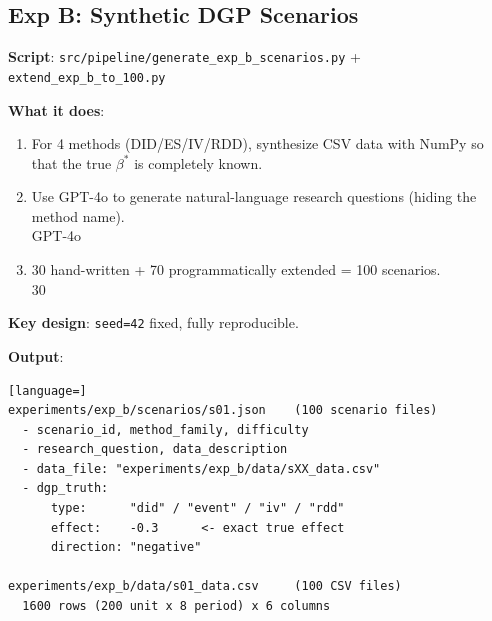 \documentclass[11pt,a4paper]{article}
\begin{document}
\subsection{Exp B: Synthetic DGP Scenarios}

\textbf{Script}: \texttt{src/pipeline/generate\_exp\_b\_scenarios.py} + \texttt{extend\_exp\_b\_to\_100.py}

\textbf{What it does}:
\begin{enumerate}[leftmargin=1.5em]
\item For 4 methods (DID/ES/IV/RDD), synthesize CSV data with NumPy so that the true $\beta^*$ is completely known. \\
      
\item Use GPT-4o to generate natural-language research questions (hiding the method name). \\
      GPT-4o 
\item 30 hand-written + 70 programmatically extended = 100 scenarios. \\
      30 
\end{enumerate}

\textbf{Key design}: \texttt{seed=42} fixed, fully reproducible.

\textbf{Output}:

\begin{lstlisting}[language=]
experiments/exp_b/scenarios/s01.json    (100 scenario files)
  - scenario_id, method_family, difficulty
  - research_question, data_description
  - data_file: "experiments/exp_b/data/sXX_data.csv"
  - dgp_truth:
      type:      "did" / "event" / "iv" / "rdd"
      effect:    -0.3      <- exact true effect
      direction: "negative"

experiments/exp_b/data/s01_data.csv     (100 CSV files)
  1600 rows (200 unit x 8 period) x 6 columns
\end{lstlisting}

\newpage

\end{document}
